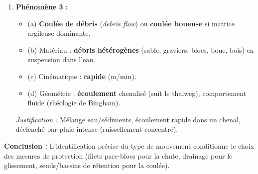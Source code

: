 \documentclass[11pt]{article}
\begin{document}
\begin{exoresolu}
\begin{enumerate}
\begin{itemize}
                \item (c) Cinématique : \textbf{lente} (cm/jour).
                \item (d) Géométrie : \textbf{rotation} autour d'un axe horizontal (surface de rupture concave, "en cuillère"), la masse bascule vers l'arrière.
            \end{itemize}
            \textit{Justification :} Surface de rupture concave (pas plane), conservation de la structure, saturation en eau (facteur déclencheur), vitesse lente.
        \item \textbf{Phénomène 3 :}
            \begin{itemize}
                \item (a) \textbf{Coulée de débris} (\emph{debris flow}) ou \textbf{coulée boueuse} si matrice argileuse dominante.
                \item (b) Matériau : \textbf{débris hétérogènes} (sable, graviers, blocs, boue, bois) en suspension dans l'eau.
                \item (c) Cinématique : \textbf{rapide} (m/min).
                \item (d) Géométrie : \textbf{écoulement} chenalisé (suit le thalweg), comportement fluide (rhéologie de Bingham).
            \end{itemize}
            \textit{Justification :} Mélange eau/sédiments, écoulement rapide dans un chenal, déclenché par pluie intense (ruissellement concentré).
    \end{enumerate}
    \textbf{Conclusion :} L'identification précise du type de mouvement conditionne le choix des mesures de protection (filets pare-blocs pour la chute, drainage pour le glissement, seuils/bassins de rétention pour la coulée).
\end{exoresolu}
\end{document}
